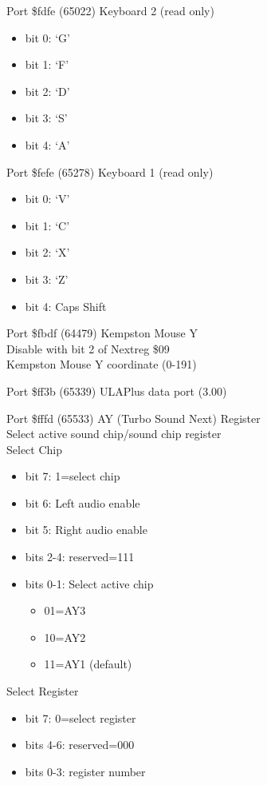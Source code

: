 Port \$fdfe (65022) Keyboard 2 (read only)
\begin{itemize}
\item[] bit 0: ‘G’
\item[] bit 1: ‘F’
\item[] bit 2: ‘D’
\item[] bit 3: ‘S’
\item[] bit 4: ‘A’
\end{itemize}

Port \$fefe (65278) Keyboard 1 (read only)
\begin{itemize}
\item[] bit 0: ‘V’
\item[] bit 1: ‘C’
\item[] bit 2: ‘X’
\item[] bit 3: ‘Z’
\item[] bit 4: Caps Shift
\end{itemize}

Port \$fbdf (64479) Kempston Mouse Y\\
Disable with bit 2 of Nextreg \$09\\
Kempston Mouse Y coordinate (0-191)

Port \$ff3b (65339) ULAPlus data port (3.00)

Port \$fffd (65533) AY (Turbo Sound Next) Register\\
Select active sound chip/sound chip register\\
Select Chip
\begin{itemize}
\item[] bit 7: 1=select chip
\item[] bit 6: Left audio enable
\item[] bit 5: Right audio enable
\item[] bits 2-4: reserved=111
\item[] bits 0-1: Select active chip
  \begin{itemize}
  \item[] 01=AY3
  \item[] 10=AY2
  \item[] 11=AY1 (default)
  \end{itemize}
\end{itemize}
 Select Register
\begin{itemize}
\item[] bit 7: 0=select register
\item[] bits 4-6: reserved=000
\item[] bits 0-3: register number
\end{itemize}
